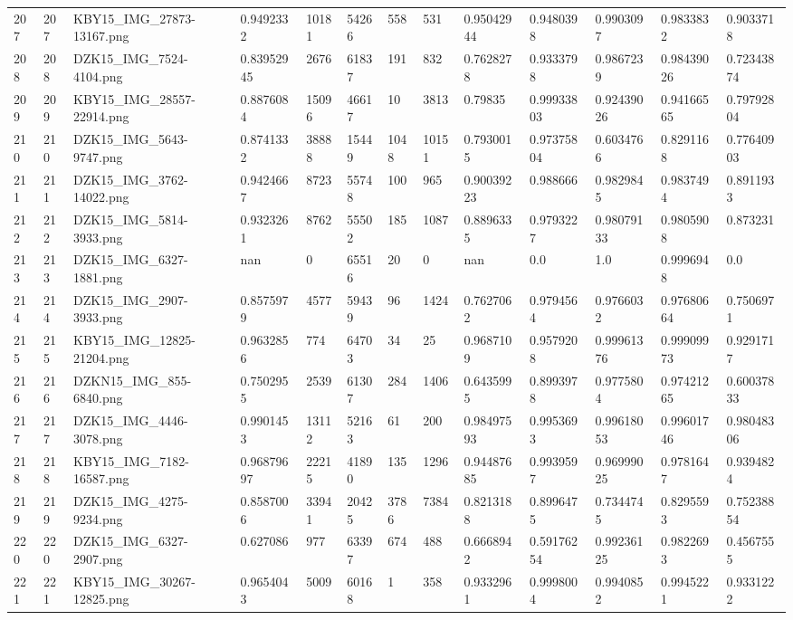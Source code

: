 \documentclass[11pt, a4paper, twoside]{report}
\begin{document}
\begin{longtable}[c]{@{}lllllllllllll@{}}
207 & 207 & KBY15\_IMG\_27873-13167.png & 0.9492332 & 10181 & 54266 & 558 & 531 & 0.95042944 & 0.9480398 & 0.9903097 & 0.9833832 & 0.9033718 \\
208 & 208 & DZK15\_IMG\_7524-4104.png & 0.83952945 & 2676 & 61837 & 191 & 832 & 0.7628278 & 0.9333798 & 0.9867239 & 0.98439026 & 0.72343874 \\
209 & 209 & KBY15\_IMG\_28557-22914.png & 0.8876084 & 15096 & 46617 & 10 & 3813 & 0.79835 & 0.99933803 & 0.92439026 & 0.94166565 & 0.79792804 \\
210 & 210 & DZK15\_IMG\_5643-9747.png & 0.8741332 & 38888 & 15449 & 1048 & 10151 & 0.7930015 & 0.97375804 & 0.6034766 & 0.8291168 & 0.77640903 \\
211 & 211 & DZK15\_IMG\_3762-14022.png & 0.9424667 & 8723 & 55748 & 100 & 965 & 0.90039223 & 0.988666 & 0.9829845 & 0.9837494 & 0.8911933 \\
212 & 212 & DZK15\_IMG\_5814-3933.png & 0.9323261 & 8762 & 55502 & 185 & 1087 & 0.8896335 & 0.9793227 & 0.98079133 & 0.9805908 & 0.873231 \\
213 & 213 & DZK15\_IMG\_6327-1881.png & nan & 0 & 65516 & 20 & 0 & nan & 0.0 & 1.0 & 0.9996948 & 0.0 \\
214 & 214 & DZK15\_IMG\_2907-3933.png & 0.8575979 & 4577 & 59439 & 96 & 1424 & 0.7627062 & 0.9794564 & 0.9766032 & 0.97680664 & 0.7506971 \\
215 & 215 & KBY15\_IMG\_12825-21204.png & 0.9632856 & 774 & 64703 & 34 & 25 & 0.9687109 & 0.9579208 & 0.99961376 & 0.99909973 & 0.9291717 \\
216 & 216 & DZKN15\_IMG\_855-6840.png & 0.7502955 & 2539 & 61307 & 284 & 1406 & 0.6435995 & 0.8993978 & 0.9775804 & 0.97421265 & 0.60037833 \\
217 & 217 & DZK15\_IMG\_4446-3078.png & 0.9901453 & 13112 & 52163 & 61 & 200 & 0.98497593 & 0.9953693 & 0.99618053 & 0.99601746 & 0.98048306 \\
218 & 218 & KBY15\_IMG\_7182-16587.png & 0.96879697 & 22215 & 41890 & 135 & 1296 & 0.94487685 & 0.9939597 & 0.96999025 & 0.9781647 & 0.9394824 \\
219 & 219 & DZK15\_IMG\_4275-9234.png & 0.8587006 & 33941 & 20425 & 3786 & 7384 & 0.8213188 & 0.8996475 & 0.7344745 & 0.8295593 & 0.75238854 \\
220 & 220 & DZK15\_IMG\_6327-2907.png & 0.627086 & 977 & 63397 & 674 & 488 & 0.6668942 & 0.59176254 & 0.99236125 & 0.9822693 & 0.4567555 \\
221 & 221 & KBY15\_IMG\_30267-12825.png & 0.9654043 & 5009 & 60168 & 1 & 358 & 0.9332961 & 0.9998004 & 0.9940852 & 0.9945221 & 0.9331222 \\

\end{longtable}
\end{document}
